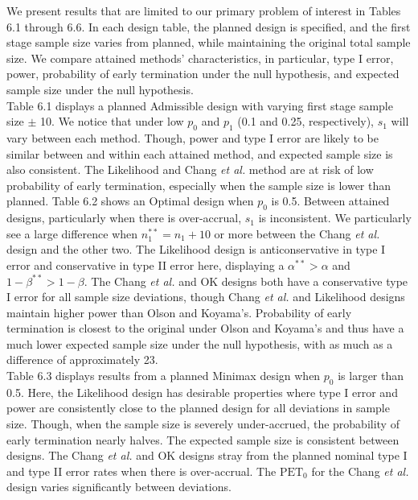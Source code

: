 \documentclass[12pt]{report}\usepackage[]{graphicx}\usepackage[]{color}
\newlength{\li}\setlength{\li}{14.48pt}
\newlength{\di}\setlength{\di}{-3.5mm}
\begin{document}
\indent We present results that are limited to our primary problem of interest in Tables 6.1 through 6.6. In each design table, the planned design is specified, and the first stage sample size varies from planned, while maintaining the original total sample size. We compare attained methods' characteristics, in particular, type I error, power, probability of early termination under the null hypothesis, and expected sample size under the null hypothesis. \\
\indent Table 6.1 displays a planned Admissible design with varying first stage sample size $\pm$ 10. We notice that under low $p_0$ and $p_1$ (0.1 and 0.25, respectively), $s_1$ will vary between each method. Though, power and type I error are likely to be similar between and within each attained method, and expected sample size is also consistent. The Likelihood and Chang \textit{et al.} method are at risk of low probability of early termination, especially when the sample size is lower than planned. Table 6.2 shows an Optimal design when $p_0$ is 0.5. Between attained designs, particularly when there is over-accrual, $s_1$ is inconsistent. We particularly see a large difference when $n_1^{\ast\ast} = n_1 + 10$ or more between the Chang \textit{et al.} design and the other two.  The Likelihood design is anticonservative in type I error and conservative in type II error here, displaying a $\alpha^{\ast\ast} > \alpha$ and $1-\beta^{\ast\ast} > 1-\beta$. The Chang \textit{et al.} and OK designs both have a conservative type I error for all sample size deviations, though Chang \textit{et al.} and Likelihood designs maintain higher power than Olson and Koyama's. Probability of early termination is closest to the original under Olson and Koyama's and thus have a much lower expected sample size under the null hypothesis, with as much as a difference of approximately 23.\\
\indent Table 6.3 displays results from a planned Minimax design when $p_0$ is larger than 0.5. Here, the Likelihood design has desirable properties where type I error and power are consistently close to the planned design for all deviations in sample size. Though, when the sample size is severely under-accrued, the probability of early termination nearly halves. The expected sample size is consistent between designs. The Chang \textit{et al.} and OK designs stray from the planned nominal type I and type II error rates when there is over-accrual. The $\mbox{PET}_0$ for the Chang \textit{et al.} design varies significantly between deviations. \\
\end{document}
